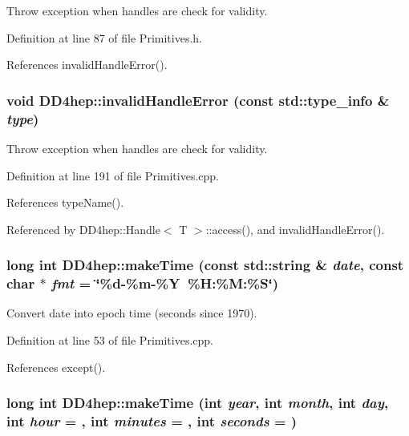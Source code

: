 Throw exception when handles are check for validity. 

Definition at line 87 of file Primitives.h.

References invalidHandleError().\hypertarget{namespace_d_d4hep_abe634ec00c4fc9e3a5e722ad0865d848}{
\subsubsection[{invalidHandleError}]{\setlength{\rightskip}{0pt plus 5cm}void DD4hep::invalidHandleError (const std::type\_\-info \& {\em type})}}
\label{namespace_d_d4hep_abe634ec00c4fc9e3a5e722ad0865d848}


Throw exception when handles are check for validity. 

Definition at line 191 of file Primitives.cpp.

References typeName().

Referenced by DD4hep::Handle$<$ T $>$::access(), and invalidHandleError().\hypertarget{namespace_d_d4hep_adf6475d1fb2f6f99ec94fd7bbcae5e49}{
\subsubsection[{makeTime}]{\setlength{\rightskip}{0pt plus 5cm}long int DD4hep::makeTime (const std::string \& {\em date}, \/  const char $\ast$ {\em fmt} = {\ttfamily \char`\"{}\%d-\/\%m-\/\%Y~\%H:\%M:\%S\char`\"{}})}}
\label{namespace_d_d4hep_adf6475d1fb2f6f99ec94fd7bbcae5e49}


Convert date into epoch time (seconds since 1970). 

Definition at line 53 of file Primitives.cpp.

References except().\hypertarget{namespace_d_d4hep_ae99d8100ffc43cc104f89aae55187f11}{
\subsubsection[{makeTime}]{\setlength{\rightskip}{0pt plus 5cm}long int DD4hep::makeTime (int {\em year}, \/  int {\em month}, \/  int {\em day}, \/  int {\em hour} = {}, \/  int {\em minutes} = {}, \/  int {\em seconds} = {})}}
\label{namespace_d_d4hep_ae99d8100ffc43cc104f89aae55187f11}


